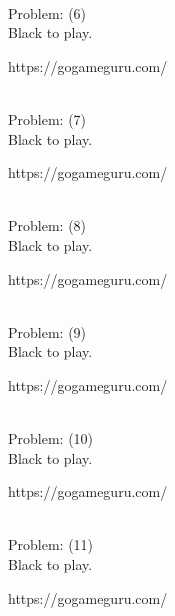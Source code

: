 \documentclass[11pt]{article}
\begin{document}
\begin{minipage}[t]{0.5\textwidth}
  {\centering
  
\\
Problem: (6)\\
Black to play.

https://gogameguru.com/\\
  }
\end{minipage}
\begin{minipage}[t]{0.5\textwidth}
  {\centering
  
\\
Problem: (7)\\
Black to play.

https://gogameguru.com/\\
  }
\end{minipage}
\begin{minipage}[t]{0.5\textwidth}
  {\centering
  
\\
Problem: (8)\\
Black to play.

https://gogameguru.com/\\
  }
\end{minipage}
\begin{minipage}[t]{0.5\textwidth}
  {\centering
  
\\
Problem: (9)\\
Black to play.

https://gogameguru.com/\\
  }
\end{minipage}
\begin{minipage}[t]{0.5\textwidth}
  {\centering
  
\\
Problem: (10)\\
Black to play.

https://gogameguru.com/\\
  }
\end{minipage}
\begin{minipage}[t]{0.5\textwidth}
  {\centering
  
\\
Problem: (11)\\
Black to play.

https://gogameguru.com/\\
  }
\end{minipage}
\end{document}

